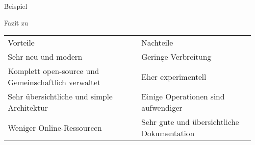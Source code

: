 \begin{frame}{Beispiel}
	\begin{minipage}{0.4\textwidth}
		\vspace{.5cm}
		\centering
		\vspace{-.5cm}
	\end{minipage}
	\hfill
	\begin{minipage}{0.4\textwidth}
	\end{minipage}
\end{frame}

\begin{frame}{Fazit zu \riscv}
	\begin{table}[h]
		\begin{tabularx}{0.95\textwidth}{L|L}
			 Vorteile                       &  Nachteile               \\
			Sehr neu und modern                                 & Geringe Verbreitung                        \\
			Komplett open-source und Gemeinschaftlich verwaltet & Eher experimentell                         \\
			Sehr übersichtliche und simple Architektur          & Einige Operationen sind aufwendiger        \\
			Weniger Online-Ressourcen                           & Sehr gute und übersichtliche Dokumentation \\
		\end{tabularx}
	\end{table}
\end{frame}
